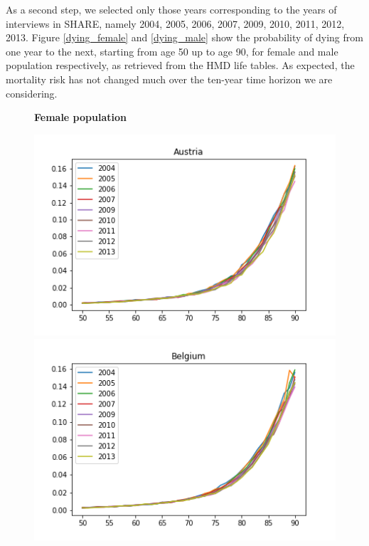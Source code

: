 As a second step, we selected only those years corresponding to the years of interviews in SHARE, namely 2004, 2005,  2006, 2007, 2009, 2010, 2011, 2012, 2013. Figure \ref{dying_female} and \ref{dying_male} show the probability of dying from one year to the next, starting from age 50 up to age 90, for female and male population respectively, as retrieved from the HMD life tables. As expected, the mortality risk has not changed much over the ten-year time horizon we are considering.


\begin{figure}[H]
\centering \textbf{Female population}\par\medskip
{}
  \includegraphics[width=\linewidth]{images/mortality_female_1.png}
\endminipage\hfill
{}
  \includegraphics[width=\linewidth]{images/mortality_female_2.png}
\endminipage\hfill
{}%

\end{figure}
